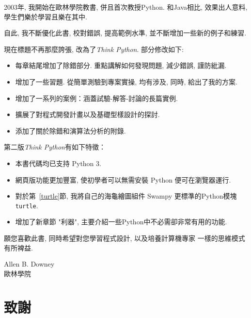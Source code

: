 \documentclass[10pt]{book}
\begin{document}
2003年, 我開始在歐林學院教書, 併且首次教授Python. 
和Java相比, 效果出人意料, 學生們樂於學習且樂在其中. 

自此, 我不斷優化此書, 校對錯誤, 提高範例水準, 
並不斷增加一些新的例子和練習. 

現在標題不再那麼誇張, 改為了{\em Think Python}. 
部分修改如下:

\begin{itemize}

\item 每章結尾增加了除錯部分. 
重點講解如何發現問題, 減少錯誤, 謹防紕漏. 

\item 增加了一些習題. 從簡單測驗到專案實操, 
均有涉及, 同時, 給出了我的方案. 

\item 增加了一系列的案例：涵蓋試驗-解答-討論的長篇實例. 

\item 擴展了對程式開發計畫以及基礎型樣設計的探討. 

\item 添加了關於除錯和演算法分析的附錄. 

\end{itemize}

第二版{\em Think Python}有如下特徵：

\begin{itemize}

\item 本書代碼均已支持 Python 3.

\item 網頁版功能更加豐富, 使初學者可以無需安裝 Python 便可在瀏覽器運行. 

\item 對於第~\ref{turtle}節, 我將自己的海龜繪圖組件 Swampy 更標準的Python模塊{\tt turtle}. 

\item 增加了新章節 "利器", 主要介紹一些Python中不必需卻非常有用的功能. 

\end{itemize}

願您喜歡此書, 同時希望對您學習程式設計, 以及培養計算機專家
一樣的思維模式有所裨益. 


Allen B. Downey \\

歐林學院 \\


\section*{致謝}
\end{document}
